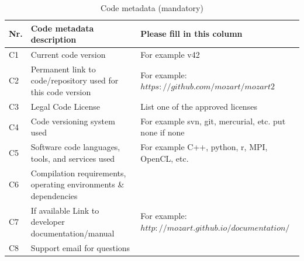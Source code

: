\documentclass[preprint,12pt, a4paper]{elsarticle}
\begin{document}
{\begin{table}[!ht]
\begin{tabular}{|l|p{6.5cm}|p{6.5cm}|}
\hline
\textbf{Nr.}                                                     & 
\textbf{Code metadata description}                               & 
\textbf{Please fill in this column}                              \\
\hline
C1                                                               & 
Current code version                                             & 
For example v42                                                  \\
\hline
C2                                                               & 
Permanent link to code/repository used for this code version     & 
For example: $https://github.com/mozart/mozart2$                 \\
\hline
C3                                                               & 
Legal Code License                                               & 
List one of the approved licenses                                \\
\hline
C4                                                               & 
Code versioning system used                                      & 
For example svn, git, mercurial, etc. put none if none           \\
\hline
C5                                                               & 
Software code languages, tools, and services used                & 
For example C++, python, r, MPI, OpenCL, etc.                    \\
\hline
C6                                                               & 
Compilation requirements, operating environments \& dependencies & 
                                                                 \\
\hline
C7                                                               & 
If available Link to developer documentation/manual              & 
For example: $http://mozart.github.io/documentation/$            \\
\hline
C8                                                               & 
Support email for questions                                      & 
                                                                 \\
\hline
\end{tabular}
\caption{Code metadata (mandatory)}\label{tab:src_metadata} 
\end{table}}
\end{document}
